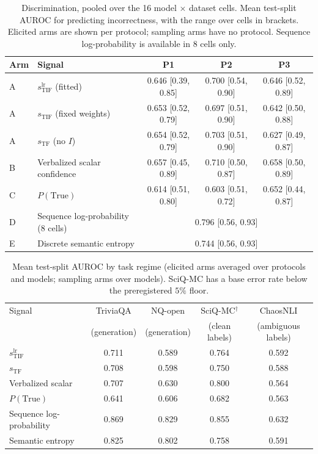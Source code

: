 \documentclass[11pt]{article}
\begin{document}
\begin{table}[t]
\centering
\caption{Discrimination, pooled over the 16 model $\times$ dataset cells. Mean test-split AUROC
for predicting incorrectness, with the range over cells in brackets. Elicited arms are shown per
protocol; sampling arms have no protocol. Sequence log-probability is available in 8 cells only.}
\label{tab:main}
\small
\begin{tabular}{llccc}
\toprule
Arm & Signal & P1 & P2 & P3 \\
\midrule
A & $s_{\mathrm{TIF}}^{\mathrm{lr}}$ (fitted) & 0.646 [0.39, 0.85] & 0.700 [0.54, 0.90] & 0.646 [0.52, 0.89] \\
A & $s_{\mathrm{TIF}}$ (fixed weights)        & 0.653 [0.52, 0.79] & 0.697 [0.51, 0.90] & 0.642 [0.50, 0.88] \\
A & $s_{\mathrm{TF}}$ (no $I$)                & 0.654 [0.52, 0.79] & 0.703 [0.51, 0.90] & 0.627 [0.49, 0.87] \\
B & Verbalized scalar confidence              & 0.657 [0.45, 0.89] & 0.710 [0.50, 0.87] & 0.658 [0.50, 0.89] \\
C & $P(\text{True})$                          & 0.614 [0.51, 0.80] & 0.603 [0.51, 0.72] & 0.652 [0.44, 0.87] \\
D & Sequence log-probability (8 cells)        & \multicolumn{3}{c}{0.796 [0.56, 0.93]} \\
E & Discrete semantic entropy                 & \multicolumn{3}{c}{0.744 [0.56, 0.93]} \\
\bottomrule
\end{tabular}
\end{table}

\begin{table}[t]
\centering
\caption{Mean test-split AUROC by task regime (elicited arms averaged over protocols and models;
sampling arms over models). SciQ-MC has a base error rate below the preregistered $5\%$ floor.}
\label{tab:bydataset}
\small
\begin{tabular}{lcccc}
\toprule
Signal & TriviaQA & NQ-open & SciQ-MC$^{\dagger}$ & ChaosNLI \\
 & (generation) & (generation) & (clean labels) & (ambiguous labels) \\
\midrule
$s_{\mathrm{TIF}}^{\mathrm{lr}}$   & 0.711 & 0.589 & 0.764 & 0.592 \\
$s_{\mathrm{TF}}$                  & 0.708 & 0.598 & 0.750 & 0.588 \\
Verbalized scalar                  & 0.707 & 0.630 & 0.800 & 0.564 \\
$P(\text{True})$                   & 0.641 & 0.606 & 0.682 & 0.563 \\
Sequence log-probability           & 0.869 & 0.829 & 0.855 & 0.632 \\
Semantic entropy                   & 0.825 & 0.802 & 0.758 & 0.591 \\
\bottomrule
\end{tabular}
\end{table}
\end{document}
